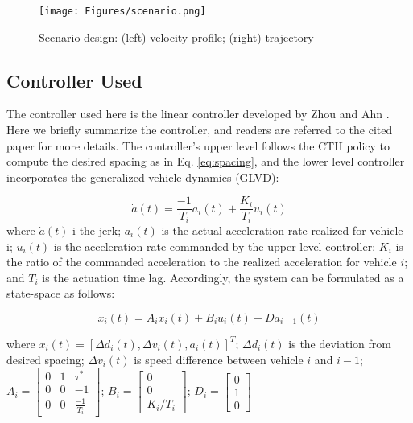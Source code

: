 \documentclass{article}
\begin{document}
\begin{figure}[!htb]
    \centering
    \centerline{\texttt{[image: Figures/scenario.png]}}
    \caption{Scenario design: (left) velocity profile; (right) trajectory}
    \label{fig:scenario}
\end{figure}

\subsection{Controller Used}
The controller used here is the linear controller developed by Zhou and Ahn \cite{zhou2019robust}. Here we briefly summarize the controller, and readers are referred to the cited paper for more details. The controller’s upper level follows the CTH policy to compute the desired spacing as in Eq. \ref{eq:spacing}, and the lower level controller incorporates the generalized vehicle dynamics (GLVD):

\begin{equation}
    \dot{a}(t) = \frac{-1}{T_{i}} a_i(t) + \frac{K_i}{T_i}u_i(t)
\end{equation}
where $\dot{a}(t)$ i the jerk; $a_i(t)$ is the actual acceleration rate realized for vehicle i; $u_i(t)$ is the acceleration rate commanded by the upper level controller; $K_i$ is the ratio of the commanded acceleration to the realized acceleration for vehicle $i$; and $T_i$ is the actuation time lag. Accordingly, the system can be formulated as a state-space as follows: 

\begin{equation}
    \dot{x}_i(t) = A_ix_i(t) + B_iu_i(t) + Da_{i-1}(t)
\end{equation}

where $x_i(t) = [\Delta d_i(t), \Delta v_i(t), a_i(t)]^T$; $\Delta d_i(t)$ is the deviation from desired spacing; $\Delta v_i(t)$ is speed difference between vehicle $i$ and $i-1$; $A_i = \begin{bmatrix} 0&1&\tau^*\\0&0&-1\\0&0&\frac{-1}{T_i}\end{bmatrix}$; $B_i = \begin{bmatrix}0\\0\\K_i/T_i\end{bmatrix}$; $D_i = \begin{bmatrix}0\\1\\0\end{bmatrix}$
\end{document}
